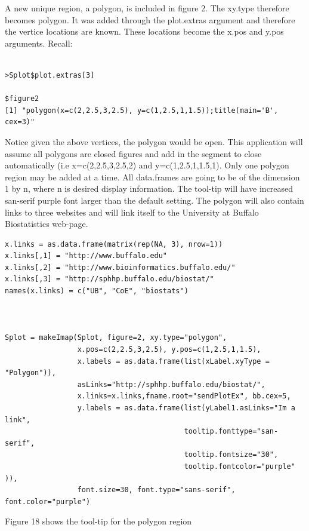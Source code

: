 \documentclass[]{article}
\begin{document}
A new unique region, a polygon,  is included in figure 2. The xy.type therefore becomes polygon. It was added through the plot.extras argument and therefore the vertice locations are known. These locations become the x.pos and y.pos arguments. Recall:

\begin{verbatim}

>Splot$plot.extras[3]

$figure2
[1] "polygon(x=c(2,2.5,3,2.5), y=c(1,2.5,1,1.5));title(main='B', cex=3)"

\end{verbatim}

Notice given the above vertices, the polygon would be open. This application will assume all polygons are closed figures and add in the segment to close automatically (i.e x=c(2,2.5,3,2.5,2) and y=c(1,2.5,1,1.5,1). \newline
\indent Only one polygon region may be added at a time. All data.frames are going to be of the dimension 1 by n, where n is desired display information. The tool-tip will have increased san-serif purple font larger than the default setting. The polygon will also contain links to three websites and will link itself to the University at Buffalo Biostatistics web-page.  


\begin{verbatim}
x.links = as.data.frame(matrix(rep(NA, 3), nrow=1))
x.links[,1] = "http://www.buffalo.edu"
x.links[,2] = "http://www.bioinformatics.buffalo.edu/"
x.links[,3] = "http://sphhp.buffalo.edu/biostat/"
names(x.links) = c("UB", "CoE", "biostats")



Splot = makeImap(Splot, figure=2, xy.type="polygon",
                 x.pos=c(2,2.5,3,2.5), y.pos=c(1,2.5,1,1.5),
                 x.labels = as.data.frame(list(xLabel.xyType = "Polygon")), 
                 asLinks="http://sphhp.buffalo.edu/biostat/",
                 x.links=x.links,fname.root="sendPlotEx", bb.cex=5,
                 y.labels = as.data.frame(list(yLabel1.asLinks="Im a link",
                                          tooltip.fonttype="san-serif",
                                          tooltip.fontsize="30",
                                          tooltip.fontcolor="purple" )), 
                 font.size=30, font.type="sans-serif", font.color="purple")
\end{verbatim}

Figure 18 shows the tool-tip for the polygon region
\end{document}
